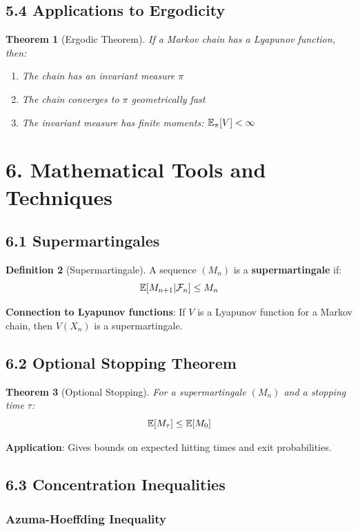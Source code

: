 \documentclass{amsart}
\let\originalmathbb\mathbb
\renewcommand{\mathbb}[1]{%
    \ifstrequal{#1}{1}{\mathbbm{#1}}{\originalmathbb{#1}}%
}
\theoremstyle{plain}
\newtheorem{theorem}{Theorem}[section]
\theoremstyle{definition}
\newtheorem{definition}[theorem]{Definition}
\theoremstyle{remark}
\begin{document}
\subsection{5.4 Applications to Ergodicity}

\begin{theorem}[Ergodic Theorem]
If a Markov chain has a Lyapunov function, then:
	\begin{enumerate}
		\item The chain has an invariant measure $\pi$
		\item The chain converges to $\pi$ geometrically fast
		\item The invariant measure has finite moments: $\mathbb{E}_\pi[V] < \infty$
	\end{enumerate}
\end{theorem}
\section{6. Mathematical Tools and Techniques}

\subsection{6.1 Supermartingales}

\begin{definition}[Supermartingale]
A sequence $(M_n)$ is a \textbf{supermartingale} if:
\[
\mathbb{E}[M_{n+1} | \mathcal{F}_n] \leq M_n
\]
\end{definition}
\textbf{Connection to Lyapunov functions}: If $V$ is a Lyapunov function for a Markov chain, then $V(X_n)$ is a supermartingale.

\subsection{6.2 Optional Stopping Theorem}

\begin{theorem}[Optional Stopping]
For a supermartingale $(M_n)$ and a stopping time $\tau$:
\[
\mathbb{E}[M_\tau] \leq \mathbb{E}[M_0]
\]
\end{theorem}
\textbf{Application}: Gives bounds on expected hitting times and exit probabilities.

\subsection{6.3 Concentration Inequalities}

\subsubsection{Azuma-Hoeffding Inequality}
\end{document}
